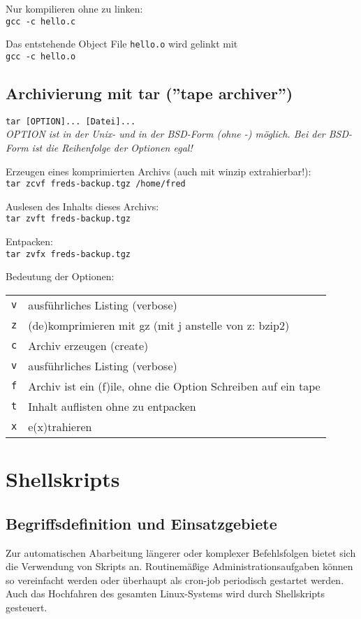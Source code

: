 \documentclass[11pt]{article}
\begin{document}
Nur kompilieren ohne zu linken:\\
\texttt{gcc -c hello.c}

Das entstehende Object File \texttt{hello.o} wird gelinkt mit\\
\texttt{gcc -c hello.o}

\subsection{Archivierung mit tar (''tape archiver'')}
\texttt{tar [OPTION]... [Datei]...}\\
\textit{OPTION ist in der Unix- und in der BSD-Form (ohne -) möglich.
  Bei der BSD-Form ist die Reihenfolge der Optionen egal!}

Erzeugen eines komprimierten Archivs (auch mit winzip extrahierbar!):\\
\texttt{tar zcvf freds-backup.tgz /home/fred}

Auslesen des Inhalts dieses Archivs:\\
\texttt{tar zvft freds-backup.tgz}

Entpacken:\\
\texttt{tar zvfx freds-backup.tgz}

Bedeutung der Optionen:\\
\begin{tabular}{|ll|}
\hline
\texttt{v} & ausführliches Listing (verbose) \\
\texttt{z} & (de)komprimieren mit gz (mit j anstelle von z: bzip2)\\
\texttt{c} & Archiv erzeugen (create) \\
\texttt{v} & ausführliches Listing (verbose) \\
\texttt{f} & Archiv ist ein (f)ile, ohne die Option Schreiben auf ein tape \\
\texttt{t} & Inhalt auflisten ohne zu entpacken \\
\texttt{x} & e(x)trahieren \\
\hline
\end{tabular}

\section{Shellskripts} 
\subsection{Begriffsdefinition und Einsatzgebiete}
Zur automatischen Abarbeitung längerer oder komplexer Befehlsfolgen
bietet sich die Verwendung von Skripts an. Routinemäßige
Administrationsaufgaben können so vereinfacht werden oder überhaupt
als cron-job periodisch gestartet werden. Auch das Hochfahren des
gesamten Linux-Systems wird durch Shellskripts gesteuert.  
\end{document}
